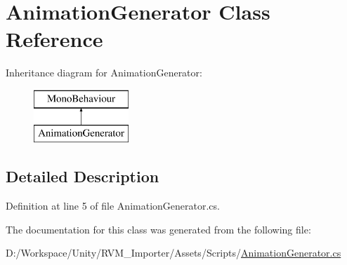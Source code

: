 \hypertarget{class_animation_generator}{}\section{Animation\+Generator Class Reference}
\label{class_animation_generator}
Inheritance diagram for Animation\+Generator\+:\begin{figure}[H]
\begin{center}
\leavevmode
\includegraphics[height=2.000000cm]{class_animation_generator}
\end{center}
\end{figure}


\subsection{Detailed Description}


Definition at line 5 of file Animation\+Generator.\+cs.



The documentation for this class was generated from the following file\+:\begin{DoxyCompactItemize}
\item 
D\+:/\+Workspace/\+Unity/\+R\+V\+M\+\_\+\+Importer/\+Assets/\+Scripts/\mbox{\hyperlink{_animation_generator_8cs}{Animation\+Generator.\+cs}}\end{DoxyCompactItemize}
